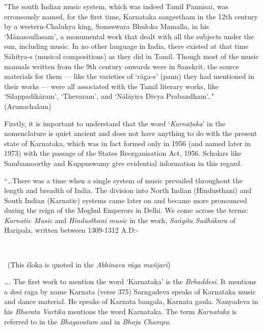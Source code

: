 \begin{myquote}
"The south Indian music system, which was indeed Tamil Pannisai, was erroneously named, for the first time, Karnataka sangeetham in the 12th century by a western-Chalukya king, Someswara Bhuloka Mamalla, in his ‘Mānasoullasam', a monumental work that dealt with all the subjects under the sun, including music. In no other language in India, there existed at that time Sāhitya-s (musical compositions) as they did in Tamil. Though most of the music manuals written from the 9th century onwards were in Sanskrit, the source materials for them — like the varieties of ‘rāga-s' (pann) they had mentioned in their works — were all associated with the Tamil literary works, like ‘Silappadikāram', ‘Thevaram', and ‘Nālāyira Divya Prabandham'.."\hfill (Arunachalam)
\end{myquote}

Firstly, it is important to understand that the word ‘\textit{Karnāṭaka}’ in the nomenclature is quiet ancient and does not have anything to do with the present state of Karnataka, which was in fact formed only in 1956 (and named later in 1973) with the passage of the States Reorganisation Act, 1956. Scholars like Sambamoorthy and Kuppuswamy give evidential information in this regard.

\newpage

\begin{myquote}
“…There was a time when a single system of music prevailed throughout the length and breadth of India. The division into North Indian (Hindusthani) and South Indian (Karnatic) systems came later on and became more pronounced during the reign of the Moghul Emperors in Delhi. We come across the terms: \textit{Karnatic Music} and \textit{Hindusthani music} in the work, \textit{Sańgīta Sudhākara} of Haripala, written between 1309-1312 A.D:-
\end{myquote}

\begin{myquote}
\\

~\hfill (This śloka is quoted in the \textit{Abhinava rāga mañjarī})
\end{myquote}

\begin{myquote}
…. The first work to mention the word ‘Karnataka’ is the \textit{Brhaddesi}. It mentions a desi raga by name Karnata (verse 375) Sarngadeva speaks of Karnataka music and dance material. He speaks of Karnata bangala, Karnata gaula. Nanyadeva in his \textit{Bharata Vartika} mentions the word Karnataka. The term \textit{Karnataka} is referred to in the \textit{Bhagavatam} and in \textit{Bhoja Champu}.
\end{myquote}

